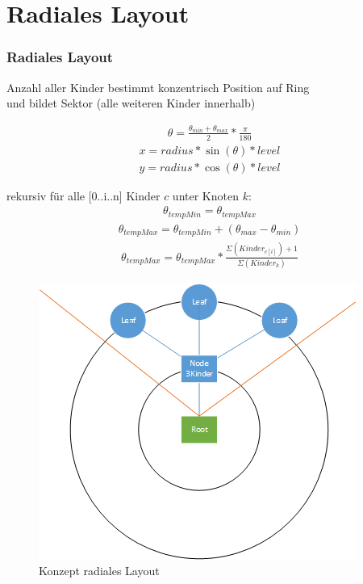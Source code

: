 \documentclass[11pt]{beamer}
\begin{document}
\section{Radiales Layout}
\begin{frame}[allowframebreaks]
\frametitle{Radiales Layout}

\begin{center}
Anzahl aller Kinder bestimmt konzentrisch Position auf Ring 
\\ und bildet Sektor (alle weiteren Kinder innerhalb)\\
\end{center}

\begin{align}
\theta = \frac{\theta_{min} + \theta_{max}}{2} * \frac{\pi}{180} 
\end{align}
\begin{align}
x = radius * \sin(\theta) * level
\\
y = radius * \cos(\theta) * level
\end{align} 

\framebreak
rekursiv für alle [0..i..n] Kinder $c$ unter Knoten $k$:
\begin{align}\theta_{tempMin} = \theta_{tempMax}\end{align}
\begin{align}\theta_{tempMax} = \theta_{tempMin} + (\theta_{max}-\theta_{min})\end{align} 
\begin{align}
\theta_{tempMax} = \theta_{tempMax} * \frac{\Sigma(Kinder_{c[i]})+1}{\Sigma(Kinder_k)}
\end{align}

\framebreak
\begin{figure}
\centering
\includegraphics[width=0.6\linewidth]{./radiall}
\caption{Konzept radiales Layout}
\label{fig:radiall}
\end{figure}

\end{frame}
\end{document}
